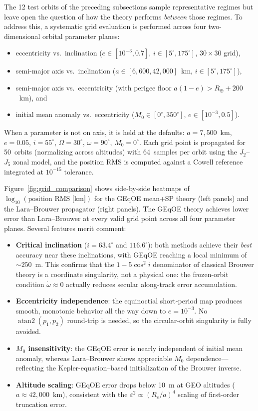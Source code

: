 \documentclass[11pt]{article}
\begin{document}
The 12 test orbits of the preceding subsections sample representative
regimes but leave open the question of how the theory performs
\emph{between} those regimes.  To address this, a systematic grid
evaluation is performed across four two-dimensional orbital parameter
planes:
\begin{itemize}
  \item eccentricity vs.\ inclination ($e \in [10^{-3}, 0.7]$,
        $i \in [5^\circ, 175^\circ]$, $30 \times 30$ grid),
  \item semi-major axis vs.\ inclination ($a \in [6{,}600, 42{,}000]$~km,
        $i \in [5^\circ, 175^\circ]$),
  \item semi-major axis vs.\ eccentricity (with perigee floor
        $a(1-e) > R_\oplus + 200$~km), and
  \item initial mean anomaly vs.\ eccentricity
        ($M_0 \in [0^\circ, 350^\circ]$, $e \in [10^{-3}, 0.5]$).
\end{itemize}
When a parameter is not on axis, it is held at the defaults:
$a = 7{,}500$~km, $e = 0.05$, $i = 55^\circ$, $\Omega = 30^\circ$,
$\omega = 90^\circ$, $M_0 = 0^\circ$.  Each grid point is propagated for
50~orbits (normalizing across altitudes) with 64~samples per orbit using
the $J_2$--$J_5$ zonal model, and the position RMS is computed against a
Cowell reference integrated at $10^{-15}$ tolerance.

Figure~\ref{fig:grid_comparison} shows side-by-side heatmaps of
$\log_{10}(\text{position RMS [km]})$ for the GEqOE mean+SP theory (left
panels) and the Lara--Brouwer propagator (right panels).  The GEqOE theory
achieves lower error than Lara--Brouwer at every valid grid point across
all four parameter planes.  Several features merit comment:
\begin{itemize}
  \item \textbf{Critical inclination}
        ($i = 63.4^\circ$ and $116.6^\circ$): both methods achieve their
        \emph{best} accuracy near these inclinations, with GEqOE reaching
        a local minimum of $\sim\!250$~m.  This confirms that the
        \mbox{$1 - 5\cos^2 i$} denominator of classical Brouwer theory is
        a coordinate singularity, not a physical one: the frozen-orbit
        condition $\dot\omega \approx 0$ actually reduces secular
        along-track error accumulation.
  \item \textbf{Eccentricity independence}: the equinoctial short-period
        map produces smooth, monotonic behavior all the way down to
        $e = 10^{-3}$.  No $\operatorname{atan2}(p_1, p_2)$ round-trip
        is needed, so the circular-orbit singularity is fully avoided.
  \item \textbf{$M_0$ insensitivity}: the GEqOE error is nearly
        independent of initial mean anomaly, whereas Lara--Brouwer shows
        appreciable $M_0$ dependence—reflecting the
        Kepler-equation--based initialization of the Brouwer inverse.
  \item \textbf{Altitude scaling}: GEqOE error drops below 10~m at
        GEO altitudes ($a \approx 42{,}000$~km), consistent with the
        $\varepsilon^2 \propto (R_e/a)^4$ scaling of first-order
        truncation error.
\end{itemize}
\end{document}
